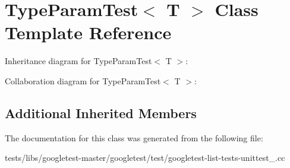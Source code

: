 \hypertarget{classTypeParamTest}{}\section{Type\+Param\+Test$<$ T $>$ Class Template Reference}
\label{classTypeParamTest}


Inheritance diagram for Type\+Param\+Test$<$ T $>$\+:


Collaboration diagram for Type\+Param\+Test$<$ T $>$\+:
\subsection*{Additional Inherited Members}


The documentation for this class was generated from the following file\+:\begin{DoxyCompactItemize}
\item 
tests/libs/googletest-\/master/googletest/test/googletest-\/list-\/tests-\/unittest\+\_\+.\+cc\end{DoxyCompactItemize}
